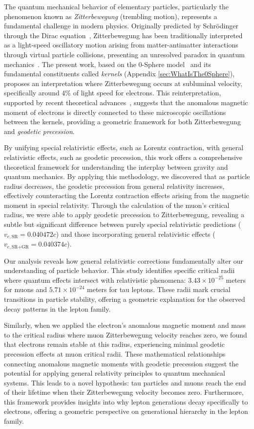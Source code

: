 \documentclass[%
 reprint,
 amsmath,amssymb,
 aps,
]{revtex4-1}
\numberwithin{equation}{section}%
\begin{document}
The quantum mechanical behavior of elementary particles, particularly the phenomenon known as \textit{Zitterbewegung} (trembling motion), represents a fundamental challenge in modern physics. Originally predicted by Schrödinger through the Dirac equation~\cite{Schrodinger1930}, Zitterbewegung has been traditionally interpreted as a light-speed oscillatory motion arising from matter-antimatter interactions through virtual particle collisions, presenting an unresolved paradox in quantum mechanics~\cite{Barut1981}. The present work, based on the 0-Sphere model~\cite{Hanamura2018} and its fundamental constituents called \textit{kernels} (Appendix \ref{sec:WhatIsThe0Sphere}), proposes an interpretation where Zitterbewegung occurs at subluminal velocity, specifically around 4\% of light speed for electrons. This reinterpretation, supported by recent theoretical advances~\cite{Hanamura2023}, suggests that the anomalous magnetic moment of electrons is directly connected to these microscopic oscillations between the kernels, providing a geometric framework for both Zitterbewegung and \textit{geodetic precession}.

By unifying special relativistic effects, such as Lorentz contraction, with general relativistic effects, such as geodetic precession, this work offers a comprehensive theoretical framework for understanding the interplay between gravity and quantum mechanics. By applying this methodology, we discovered that as particle radius decreases, the geodetic precession from general relativity increases, effectively counteracting the Lorentz contraction effects arising from the magnetic moment in special relativity. Through the calculation of the muon's critical radius, we were able to apply geodetic precession to Zitterbewegung, revealing a subtle but significant difference between purely special relativistic predictions ($v_{e,\text{SR}} = 0.040472c$) and those incorporating general relativistic effects ($v_{e,\text{SR+GR}} = 0.040374c$).

Our analysis reveals how general relativistic corrections fundamentally alter our understanding of particle behavior. This study identifies specific critical radii where quantum effects intersect with relativistic phenomena: $3.43 \times 10^{-25}$ meters for muons and $5.71 \times 10^{-24}$ meters for tau leptons. These radii mark crucial transitions in particle stability, offering a geometric explanation for the observed decay patterns in the lepton family.

Similarly, when we applied the electron's anomalous magnetic moment and mass to the critical radius where muon Zitterbewegung velocity reaches zero, we found that electrons remain stable at this radius, experiencing minimal geodetic precession effects at muon critical radii. These mathematical relationships connecting anomalous magnetic moments with geodetic precession suggest the potential for applying general relativity principles to quantum mechanical systems. This leads to a novel hypothesis: tau particles and muons reach the end of their lifetime when their Zitterbewegung velocity becomes zero. Furthermore, this framework provides insights into why lepton generations decay specifically to electrons, offering a geometric perspective on generational hierarchy in the lepton family.
\end{document}
